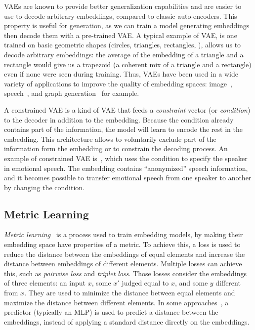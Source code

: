 VAEs are known to provide better generalization capabilities and are easier to use to decode arbitrary embeddings, compared to classic auto-encoders.
This property is useful for generation, as we can train a model generating embeddings then decode them with a pre-trained VAE.
A typical example of VAE, is one trained on basic geometric shapes (circles, triangles, rectangles, \etc), allows us to decode arbitrary embeddings:
the average of the embedding of a triangle and a rectangle would give us a trapezoid (a coherent mix of a triangle and a rectangle) even if none were seen during training.
Thus, VAEs have been used in a wide variety of applications to improve the quality of embedding spaces: image~\cite{vae:2013:kingma}, speech~\cite{deep-metric-multispeaker:2020:kulkarni}, and graph generation~\cite{graph-vae:2016:kipf} for example.


A constrained VAE is a kind of VAE that feeds a \textit{constraint} vector (or \textit{condition}) to the decoder in addition to the embedding.
Because the condition already contains part of the information, the model will learn to encode the rest in the embedding.
This architecture allows to voluntarily exclude part of the information form the embedding or to constrain the decoding process.
An example of constrained VAE is~\cite{deep-metric-multispeaker:2020:kulkarni}, which uses the condition to specify the speaker in emotional speech.
The embedding contains ``anonymized'' speech information, and it becomes possible to transfer emotional speech from one speaker to another by changing the condition.

\subsection{Metric Learning}
\textit{Metric learning}~\cite{vae-metric-learning:2018:xudong} is a process used to train embedding models, by making their embedding space have properties of a metric.
To achieve this, a loss is used to reduce the distance between the embeddings of equal elements and increase the distance between embeddings of different elements.
Multiple losses can achieve this, such as \textit{pairwise loss} and \textit{triplet loss}. 
Those losses consider the embeddings of three elements: an input $x$, some $x'$ judged equal to $x$, and some $y$ different from $x$.
They are used to minimize the distance between equal elements and maximize the distance between different elements.
In some approaches~\cite{deep-metric-multispeaker:2020:kulkarni}, a predictor (typically an MLP) is used to predict a distance between the embeddings, instead of applying a standard distance directly on the embeddings.

